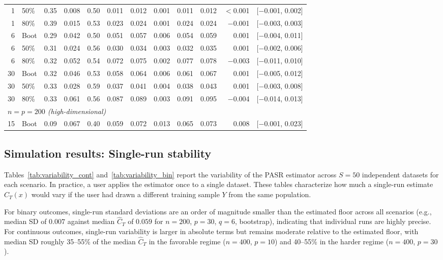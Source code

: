 \documentclass[11pt]{article}
\theoremstyle{plain}
\theoremstyle{definition}
\theoremstyle{remark}
\begin{document}
\begin{table}[htbp!]
\begin{tabular}{rlrrrrrrrrrl}
		1  & 50\% & 0.35 & 0.008 & 0.50 & 0.011 & 0.012 & 0.001     & 0.011 & 0.012 & $<$0.001 & [$-$0.001, 0.002] \\
		1  & 80\% & 0.39 & 0.015 & 0.53 & 0.023 & 0.024 & 0.001     & 0.024 & 0.024 & $-$0.001 & [$-$0.003, 0.003] \\
		6  & Boot & 0.29 & 0.042 & 0.50 & 0.051 & 0.057 & 0.006     & 0.054 & 0.059 & 0.001 & [$-$0.004, 0.011] \\
		6  & 50\% & 0.31 & 0.024 & 0.56 & 0.030 & 0.034 & 0.003     & 0.032 & 0.035 & 0.001 & [$-$0.002, 0.006] \\
		6  & 80\% & 0.32 & 0.052 & 0.54 & 0.072 & 0.075 & 0.002     & 0.077 & 0.078 & $-$0.003 & [$-$0.011, 0.010] \\
		30 & Boot & 0.32 & 0.046 & 0.53 & 0.058 & 0.064 & 0.006     & 0.061 & 0.067 & 0.001 & [$-$0.005, 0.012] \\
		30 & 50\% & 0.33 & 0.028 & 0.59 & 0.037 & 0.041 & 0.004     & 0.038 & 0.043 & 0.001 & [$-$0.003, 0.008] \\
		30 & 80\% & 0.33 & 0.061 & 0.56 & 0.087 & 0.089 & 0.003     & 0.091 & 0.095 & $-$0.004 & [$-$0.014, 0.013] \\[4pt]
		\multicolumn{12}{l}{\textit{$n = p = 200$ (high-dimensional)}} \\[2pt]
		15 & Boot & 0.09 & 0.067 & 0.40 & 0.059 & 0.072 & 0.013     & 0.065 & 0.073 & 0.008 & [$-$0.001, 0.023] \\
		\hline
	\end{tabular}
\end{table}


\newpage

\subsection{Simulation results: Single-run stability}
\label{app:stability}

Tables~\ref{tab:variability_cont} and~\ref{tab:variability_bin} report the variability of the PASR estimator across $S = 50$ independent datasets for each scenario. In practice, a user applies the estimator once to a single dataset. These tables characterize how much a single-run estimate $\widehat C_T(x)$ would vary if the user had drawn a different training sample $Y$ from the same population.

For binary outcomes, single-run standard deviations are an order of magnitude smaller than the estimated floor across all scenarios (e.g., median SD of $0.007$ against median $\widehat C_T$ of $0.059$ for $n = 200$, $p = 30$, $q = 6$, bootstrap), indicating that individual runs are highly precise. For continuous outcomes, single-run variability is larger in absolute terms but remains moderate relative to the estimated floor, with median SD roughly 35--55\% of the median $\widehat C_T$ in the favorable regime ($n = 400$, $p = 10$) and 40--55\% in the harder regime ($n = 400$, $p = 30$).
\end{document}
